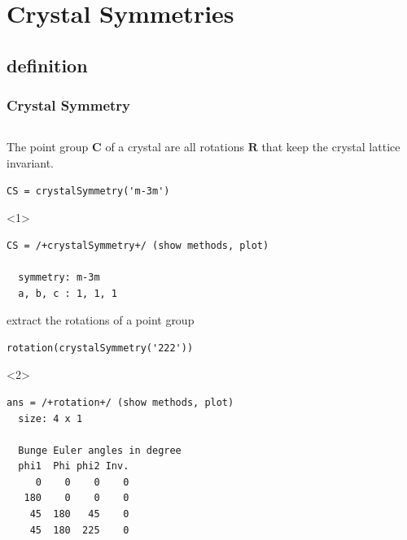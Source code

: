 \documentclass[compress]{beamer}
\begin{document}
\section{Crystal Symmetries}
\label{sec:symmetries}

\subsection*{definition}
\label{sec:crystal-symmetries}

\begin{frame}
  \frametitle{Crystal Symmetry}

  \begin{columns}
  \begin{column}{8cm}

    \begin{overlayarea}{8cm}{8cm}
      The \alert{point group} $\mathbf C$ of a crystal are all rotations
      $\mathbf R$ that keep the crystal lattice invariant.

\begin{lstlisting}[style=input]
CS = crystalSymmetry('m-3m')
\end{lstlisting}
    \begin{onlyenv}<1>
\vspace{-.3cm}\begin{lstlisting}[style=output]
CS = /+crystalSymmetry+/ (show methods, plot)

  symmetry: m-3m
  a, b, c : 1, 1, 1
\end{lstlisting}
    \end{onlyenv}

    \pause \medskip

    extract the rotations of a point group
\begin{lstlisting}[style=input]
 rotation(crystalSymmetry('222'))
\end{lstlisting}
    \begin{onlyenv}<2>
\vspace{-.3cm}\begin{lstlisting}[style=output]
ans = /+rotation+/ (show methods, plot)
  size: 4 x 1

  Bunge Euler angles in degree
  phi1  Phi phi2 Inv.
     0    0    0    0
   180    0    0    0
    45  180   45    0
    45  180  225    0
\end{lstlisting}
    \end{onlyenv}

    \pause \medskip


\end{overlayarea}
\end{column}
\end{columns}
\end{frame}
\end{document}
